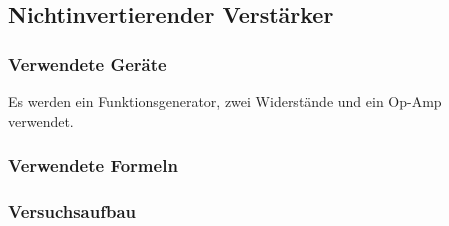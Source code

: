 \documentclass[12pt,a4paper]{article}
\begin{document}
\subsection{Nichtinvertierender Verstärker}
\subsubsection{Verwendete Geräte}

Es werden ein Funktionsgenerator, zwei Widerstände und ein Op-Amp verwendet.

\subsubsection{Verwendete Formeln}
\subsubsection{Versuchsaufbau}
\end{document}

